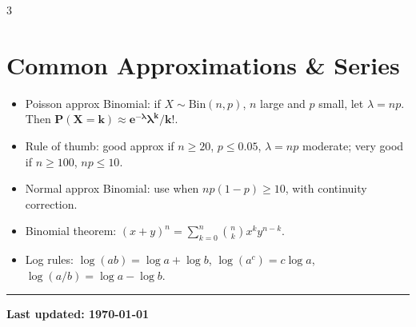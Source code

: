 \documentclass[11pt,landscape]{article}
\begin{document}
\begin{multicols}{3}
\section{Common Approximations \& Series}
\begin{itemize}
  \item Poisson approx Binomial: if $X\sim\text{Bin}(n,p)$, $n$ large and $p$ small, let $\lambda=np$. Then $\mathbf{P(X=k)\approx e^{-\lambda}\lambda^k/k!}$.
  \item Rule of thumb: good approx if $n\ge20$, $p\le0.05$, $\lambda=np$ moderate; very good if $n\ge100$, $np\le10$.
  \item Normal approx Binomial: use when $np(1-p)\ge10$, with continuity correction.
  \item Binomial theorem: $(x+y)^n=\sum_{k=0}^n \binom{n}{k}x^k y^{n-k}$.
  \item Log rules: $\log(ab)=\log a+\log b$, $\log(a^c)=c\log a$, $\log(a/b)=\log a-\log b$.
\end{itemize}

\vfill\null
\end{multicols}



\vspace{0.2em}
\hrule
\vspace{0.1em}
\begin{center}\scriptsize\bfseries\boldmath Last updated: \today\end{center}
\end{document}
